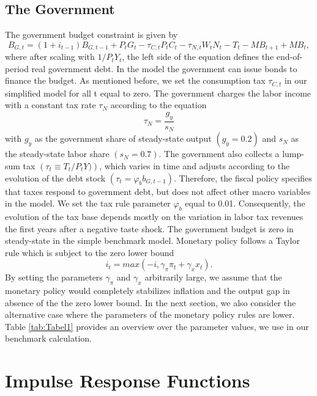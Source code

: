 \documentclass[12pt,a4paper,oneside,titlepage]{article}
\begin{document}
\subsection*{The Government}

The government budget constraint is given by
\begin{equation}
B_{G,t} = \left(1 + i_{t-1}\right)B_{G,t-1} + P_tG_t - \tau_{C,t}P_tC_t - \tau_{N,t}W_tN_t - T_t - MB_{t+1} + MB_t,  \nonumber
\end{equation}
where after scaling with $1/ P_tY_t$, the left side of the equation defines the end-of-period real government debt. In the model the government can issue bonds to finance the budget. As mentioned before, we set the consumption tax $\tau_{C,t}$ in our simplified model for all t equal to zero. The government charges the labor income with a constant tax rate $\tau_N$ according to the equation \[\tau_N = \frac{g_y}{s_N}\] with $g_y$ as the government share of steady-state output $\left(g_y = 0.2 \right)$ and $s_N$ as the steady-state labor share $\left(s_N = 0.7\right)$.
The government also collects a lump-sum tax $\left(\tau_t \equiv T_t/P_tY)\right)$, which varies in time and adjusts according to the evolution of the debt stock $\left(\tau_t = \varphi_b b_{G,t-1}\right)$. Therefore, the fiscal policy specifies that taxes respond to government debt, but does not affect other macro variables in the model. We set the tax rule parameter $\varphi_b$ equal to 0.01. Consequently, the evolution of the tax base depends mostly on the variation in labor tax revenues the first years after a negative taste shock. The government budget is zero in steady-state in the simple benchmark model.\newline
Monetary policy follows a Taylor rule which is subject to the zero lower bound
\begin{equation}
i_t = max \left(-i, \gamma_{\pi} \pi_t + \gamma_x x_t\right)  \nonumber.
\end{equation}
By setting the parameters $\gamma_{\pi}$ and $\gamma_x$ arbitrarily large, we assume that the monetary policy would completely stabilizes inflation and the output gap in absence of the the zero lower bound. In the next section, we also consider the alternative case where the parameters of the monetary policy rules are lower.\newline
Table \ref{tab:Tabel1} provides an overview over the parameter values, we use in our benchmark calculation.
\bigskip


\section{Impulse Response Functions}
\end{document}
